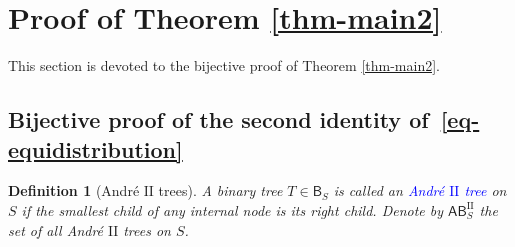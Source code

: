 \documentclass[12pt]{article}
\def\blue{\textcolor{blue}}
\def\blue{\textcolor{blue}}
\numberwithin{equation}{section}
\def\blue{\textcolor{blue}}
\def\blue{\textcolor{blue}}
\theoremstyle{plain}
\newtheorem{definition}[theorem]{Definition}
\def\B{\mathsf{B}}
\def\AB{\mathsf{AB}}
\begin{document}
   			
   			
   			
   		
  \section{Proof of Theorem \ref{thm-main2}} %
  \label{Sec:4}
   		This section is devoted to the bijective proof of Theorem \ref{thm-main2}.  
		
		\subsection{Bijective proof of the second identity of~\eqref{eq-equidistribution}}
   		\begin{definition}[Andr\'e $\mathrm{II}$ trees]
		A binary tree $T\in\B_S$ is called an \blue{ Andr\'e $\mathrm{II}$ tree} on $S$ if the smallest
child of any internal node is its right child. 
   			Denote by $\AB^{\mathrm{II}}_S$ the set of all   Andr\'e $\mathrm{II}$ trees on $S$. 
			\end{definition} 		
\end{document}

